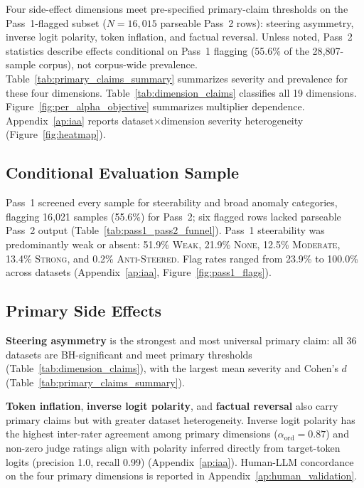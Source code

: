 
Four side-effect dimensions meet pre-specified primary-claim thresholds on the Pass~1-flagged subset ($N{=}16{,}015$ parseable Pass~2 rows): steering asymmetry, inverse logit polarity, token inflation, and factual reversal.
Unless noted, Pass~2 statistics describe effects conditional on Pass~1 flagging (55.6\% of the 28{,}807-sample corpus), not corpus-wide prevalence.
Table~\ref{tab:primary_claims_summary} summarizes severity and prevalence for these four dimensions. Table~\ref{tab:dimension_claims} classifies all 19 dimensions.
Figure~\ref{fig:per_alpha_objective} summarizes multiplier dependence. Appendix~\ref{ap:iaa} reports dataset$\times$dimension severity heterogeneity (Figure~\ref{fig:heatmap}).



\subsection{Conditional Evaluation Sample}\label{Conditional Evaluation Sample}
Pass~1 screened every sample for steerability and broad anomaly categories, flagging 16{,}021 samples (55.6\%) for Pass~2; six flagged rows lacked parseable Pass~2 output (Table~\ref{tab:pass1_pass2_funnel}).
Pass~1 steerability was predominantly weak or absent: 51.9\% \textsc{Weak}, 21.9\% \textsc{None}, 12.5\% \textsc{Moderate}, 13.4\% \textsc{Strong}, and 0.2\% \textsc{Anti-Steered}.
Flag rates ranged from 23.9\% to 100.0\% across datasets (Appendix~\ref{ap:iaa}, Figure~\ref{fig:pass1_flags}).



\subsection{Primary Side Effects}
\textbf{Steering asymmetry} is the strongest and most universal primary claim: all 36 datasets are BH-significant and meet primary thresholds (Table~\ref{tab:dimension_claims}), with the largest mean severity and Cohen's $d$ (Table~\ref{tab:primary_claims_summary}).

\textbf{Token inflation}, \textbf{inverse logit polarity}, and \textbf{factual reversal} also carry primary claims but with greater dataset heterogeneity.
Inverse logit polarity has the highest inter-rater agreement among primary dimensions ($\alpha_{\mathrm{ord}}{=}0.87$) and non-zero judge ratings align with polarity inferred directly from target-token logits (precision 1.0, recall 0.99) (Appendix~\ref{ap:iaa}).
Human-LLM concordance on the four primary dimensions is reported in Appendix~\ref{ap:human_validation}.

